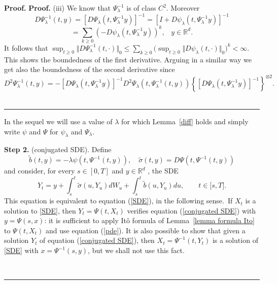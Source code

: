\documentclass[a4paper,11pt]{article}
\newenvironment{proof}[1][Proof]{\textbf{#1.} }{\ \rule{0.5em}{0.5em}}
\begin{document}
\begin{proof}
\begin{proof}
\vskip2mm (iii) We know that $\Psi _{\lambda }^{-1}$ is of class $C^{2}$.
Moreover
\begin{equation*}
D\Psi _{\lambda }^{-1}(t,y)=[D\Psi _{\lambda }(t,\Psi _{\lambda
}^{-1}y)]^{-1}=[I+D\psi _{\lambda }(t,\Psi _{\lambda }^{-1}y)]^{-1}
\end{equation*}
\begin{equation*}
=\sum_{k\geq 0}(-D\psi _{\lambda }(t,\Psi _{\lambda }^{-1}y))^{k},\;\;\;y\in
\mathbb{R}^{d}.
\end{equation*}
It follows that $\sup_{t\geq 0}\Vert D\Psi _{\lambda }^{-1}(t,\cdot )\Vert
_{0}\leq \sum_{k\geq 0}\big (\sup_{t\geq 0}\Vert D\psi _{\lambda }(t,\cdot
)\Vert _{0}\big )^{k}<\infty $. This shows the boundedness of the first
derivative. Arguing in a similar way we get also the boundedness of the
second derivative since
\begin{equation*}
D^{2}\Psi _{\lambda }^{-1}(t,y)=-[D\Psi _{\lambda }(t,\Psi _{\lambda
}^{-1}y)]^{-1}D^{2}\Psi _{\lambda }(t,\Psi _{\lambda }^{-1}(t,y))\left\{
[D\Psi _{\lambda }(t,\Psi _{\lambda }^{-1}y)]^{-1}\right\} ^{\otimes 2}.
\end{equation*}
\end{proof}

\vskip2mm In the sequel we will use a value of $\lambda $ for which Lemma~\ref{diff} holds and simply write $\psi $ and $\Psi $ for $\psi _{\lambda }$
and $\Psi _{\lambda }$.

\smallskip \textbf{Step 2.} (conjugated SDE). Define
\begin{equation*}
\widetilde{b}(t,y)=-\lambda \psi (t,\Psi ^{-1}(t,y)),\quad \widetilde{\sigma
}(t,y)=D\Psi (t,\Psi ^{-1}(t,y))
\end{equation*}
and consider, for every $s\in \left[ 0,T\right] $ and $y\in {\mathbb{R}}^{d}$%
, the SDE
\begin{equation}
Y_{t}=y+\int_{s}^{t}\tilde{\sigma}(u,Y_{u})dW_{u}+\int_{s}^{t}\widetilde{b}%
(u,Y_{u})du,\qquad t\in \lbrack s,T].  \label{conjugated SDE}
\end{equation}
This equation is equivalent to equation (\ref{SDE}), in the following
sense.\ If $X_{t}$ is a solution to \eqref{SDE}, then $Y_{t}=\Psi (t,X_{t})$
verifies equation (\ref{conjugated SDE}) with $y=\Psi (s,x)$: it is
sufficient to apply It\^{o} formula of Lemma~\ref{lemma formula Ito} to $%
\Psi (t,X_{t})$ and use equation (\ref{pde}). It is also possible to show
that given a solution $Y_{t}$ of equation (\ref{conjugated SDE}), then $%
X_{t}=\Psi ^{-1}(t,Y_{t})$ is a solution of \eqref{SDE} with $x=\Psi
^{-1}(s,y)$, but we shall not use this fact.


\end{proof}
\end{document}
